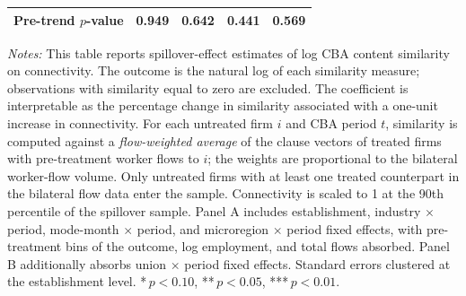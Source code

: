 \begin{table}[H]
\begin{tabular}{lcccc}
Pre-trend $p$-value & 0.949 & 0.642 & 0.441 & 0.569 \\
\hline\hline
\end{tabular}
\begin{minipage}{\linewidth}
\smallskip
\scriptsize\textit{Notes:} This table reports spillover-effect estimates of log CBA content similarity on connectivity. The outcome is the natural log of each similarity measure; observations with similarity equal to zero are excluded. The coefficient is interpretable as the percentage change in similarity associated with a one-unit increase in connectivity. For each untreated firm $i$ and CBA period $t$, similarity is computed against a \emph{flow-weighted average} of the clause vectors of treated firms with pre-treatment worker flows to $i$; the weights are proportional to the bilateral worker-flow volume. Only untreated firms with at least one treated counterpart in the bilateral flow data enter the sample. Connectivity is scaled to 1 at the 90th percentile of the spillover sample. Panel A includes establishment, industry $\times$ period, mode-month $\times$ period, and microregion $\times$ period fixed effects, with pre-treatment bins of the outcome, log employment, and total flows absorbed. Panel B additionally absorbs union $\times$ period fixed effects. Standard errors clustered at the establishment level. *\,$p<0.10$, **\,$p<0.05$, ***\,$p<0.01$.
\end{minipage}
\end{table}
